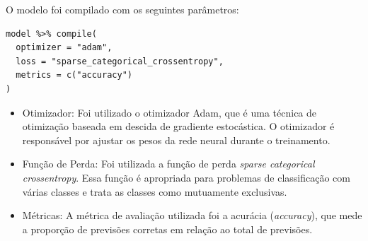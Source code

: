 \documentclass[11pt]{article}
\theoremstyle{definition}
\begin{document}
O modelo foi compilado com os seguintes parâmetros:

\begin{verbatim}
model %>% compile(
  optimizer = "adam",
  loss = "sparse_categorical_crossentropy",
  metrics = c("accuracy")
)
\end{verbatim}

\begin{itemize}
  \item Otimizador: Foi utilizado o otimizador Adam, que é uma técnica de otimização baseada em descida de gradiente estocástica. O otimizador é responsável por ajustar os pesos da rede neural durante o treinamento.
  \item Função de Perda: Foi utilizada a função de perda \textit{sparse categorical crossentropy}. Essa função é apropriada para problemas de classificação com várias classes e trata as classes como mutuamente exclusivas.
  \item Métricas: A métrica de avaliação utilizada foi a acurácia (\textit{accuracy}), que mede a proporção de previsões corretas em relação ao total de previsões.
\end{itemize}

\section{}
\end{document}
